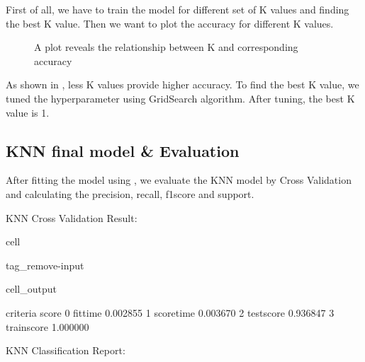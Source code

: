 \documentclass[letterpaper,10pt,english]{jupyterBook}
\let\sphinxpxdimen\pdfpxdimen\else\newdimen\sphinxpxdimen
\begin{document}
\sphinxAtStartPar
First of all, we have to train the model for different set of K values and finding the best K value.
Then we want to plot the accuracy for different K values.

\begin{figure}[htbp]
\centering
\capstart

\noindent\sphinxincludegraphics[width=500\sphinxpxdimen]{{k_accuracy}.png}
\caption{A plot reveals the relationship between K and corresponding accuracy}\label{\detokenize{analysis:f2}}\end{figure}

\sphinxAtStartPar
As shown in {\hyperref[\detokenize{analysis:f2}]{}}, less K values provide higher accuracy. To find the best K value, we tuned the hyperparameter using GridSearch algorithm. After tuning, the best K value is 1.


\subsection{KNN final model \& Evaluation}
\label{\detokenize{analysis:knn-final-model-evaluation}}
\sphinxAtStartPar
After fitting the model using , we evaluate the KNN model by Cross Validation and calculating the precision, recall, f1\sphinxhyphen{}score and support.

\sphinxAtStartPar
KNN Cross Validation Result:

\begin{sphinxuseclass}{cell}
\begin{sphinxuseclass}{tag_remove-input}\begin{sphinxVerbatimOutput}

\begin{sphinxuseclass}{cell_output}
\begin{sphinxVerbatim}[commandchars=\\\{\}]
      criteria     score
0     fit\PYGZus{}time  0.002855
1   score\PYGZus{}time  0.003670
2   test\PYGZus{}score  0.936847
3  train\PYGZus{}score  1.000000
\end{sphinxVerbatim}

\end{sphinxuseclass}\end{sphinxVerbatimOutput}

\end{sphinxuseclass}
\end{sphinxuseclass}
\sphinxAtStartPar
KNN Classification Report:
\end{document}
